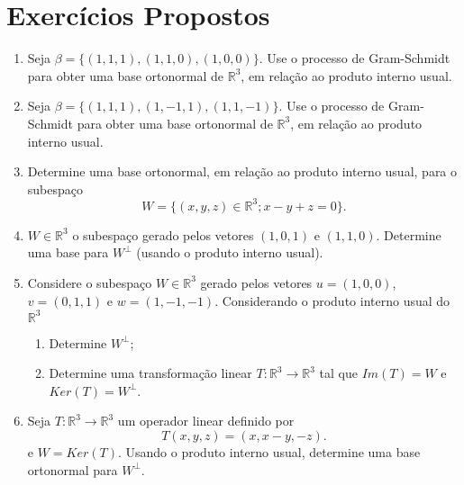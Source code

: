 \section{Exercícios Propostos}
\begin{enumerate}


\item Seja $\beta=\{ (1,1,1), (1,1,0), (1,0,0)\}$. Use o processo de Gram-Schmidt para obter uma base ortonormal de $\mathbb{R}^3$, em relação ao produto interno usual.


\item Seja $\beta=\{ (1,1,1), (1,-1,1), (1,1,-1)\}$. Use o processo de Gram-Schmidt para obter uma base ortonormal de $\mathbb{R}^3$, em relação ao produto interno usual.

\item Determine uma base ortonormal, em relação ao produto interno usual,  para o subespaço $$W=\{(x,y,z) \in \mathbb{R}^3; x-y+z=0\}.$$


\item $W \in \mathbb{R}^3$ o subespaço gerado pelos vetores $(1,0,1)$ e $(1,1,0)$. Determine uma base para $W^{\perp}$ (usando o produto interno usual).
\item Considere o subespaço $W \in \mathbb{R}^3$ gerado pelos vetores  $u=(1,0,0)$, $v=(0,1,1)$  e $w=(1,-1,-1)$.  Considerando o produto interno usual do $\mathbb{R}^3$

      \begin{enumerate}
     \item Determine $W^{\perp}$;
       \item  Determine uma  transformação linear $T: \mathbb{R}^3 \rightarrow \mathbb{R}^3$ tal que $Im(T)=W$ e $Ker(T)=W^{\perp}$.
     \end{enumerate}

\item Seja $T: \mathbb{R}^3 \rightarrow \mathbb{R}^3$ um operador linear   definido por $$T(x,y,z)=(x,x-y, -z).$$ e $W=Ker(T)$.  Usando o produto interno usual, determine uma base ortonormal para $W^{\perp}$.
\end{enumerate}


